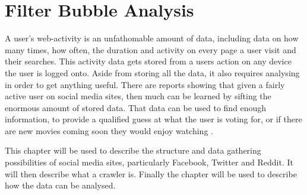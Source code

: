 \chapter{Filter Bubble Analysis}
A user's web-activity is an unfathomable amount of data, including data on how
many times, how often, the duration and activity on every page a user visit and
their searches. This activity data gets stored from a users action on any device
the user is logged onto. Aside from storing all the data, it also requires
analysing in order to get anything useful.
There are reports showing that given a fairly active user on social media sites,
then much can be learned by sifting the enormous amount of stored data. That
data can be used to find enough information, to provide a qualified guess at
what the user is voting for, or if there are new movies coming soon they would
enjoy watching \citep{Personality}.\nl

This chapter will be used to describe the structure and data gathering
possibilities of social media sites, particularly Facebook, Twitter and Reddit.
It will then describe what a crawler is. Finally the chapter will be used to
describe how the data can be analysed.
